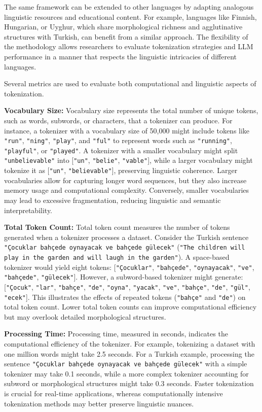 The same framework can be extended to other languages by adapting analogous linguistic resources and educational content. For example, languages like Finnish, Hungarian, or Uyghur, which share morphological richness and agglutinative structures with Turkish, can benefit from a similar approach. The flexibility of the methodology allows researchers to evaluate tokenization strategies and LLM performance in a manner that respects the linguistic intricacies of different languages.

Several metrics are used to evaluate both computational and linguistic aspects of tokenization.

\textbf{Vocabulary Size:}  
Vocabulary size represents the total number of unique tokens, such as words, subwords, or characters, that a tokenizer can produce. For instance, a tokenizer with a vocabulary size of 50,000 might include tokens like \texttt{"run"}, \texttt{"ning"}, \texttt{"play"}, and \texttt{"ful"} to represent words such as \texttt{"running"}, \texttt{"playful"}, or \texttt{"played"}. A tokenizer with a smaller vocabulary might split \texttt{"unbelievable"} into [\texttt{"un"}, \texttt{"belie"}, \texttt{"vable"}], while a larger vocabulary might tokenize it as [\texttt{"un"}, \texttt{"believable"}], preserving linguistic coherence. Larger vocabularies allow for capturing longer word sequences, but they also increase memory usage and computational complexity. Conversely, smaller vocabularies may lead to excessive fragmentation, reducing linguistic and semantic interpretability.

\textbf{Total Token Count:}  
Total token count measures the number of tokens generated when a tokenizer processes a dataset. Consider the Turkish sentence \texttt{"Çocuklar bahçede oynayacak ve bahçede gülecek"} (\texttt{"The children will play in the garden and will laugh in the garden"}). A space-based tokenizer would yield eight tokens: [\texttt{"Çocuklar"}, \texttt{"bahçede"}, \texttt{"oynayacak"}, \texttt{"ve"}, \texttt{"bahçede"}, \texttt{"gülecek"}]. However, a subword-based tokenizer might generate: [\texttt{"Çocuk"}, \texttt{"lar"}, \texttt{"bahçe"}, \texttt{"de"}, \texttt{"oyna"}, \texttt{"yacak"}, \texttt{"ve"}, \texttt{"bahçe"}, \texttt{"de"}, \texttt{"gül"}, \texttt{"ecek"}]. This illustrates the effects of repeated tokens (\texttt{"bahçe"} and \texttt{"de"}) on total token count. Lower total token counts can improve computational efficiency but may overlook detailed morphological structures.

\textbf{Processing Time:}  
Processing time, measured in seconds, indicates the computational efficiency of the tokenizer. For example, tokenizing a dataset with one million words might take 2.5 seconds. For a Turkish example, processing the sentence \texttt{"Çocuklar bahçede oynayacak ve bahçede gülecek"} with a simple tokenizer may take 0.1 seconds, while a more complex tokenizer accounting for subword or morphological structures might take 0.3 seconds. Faster tokenization is crucial for real-time applications, whereas computationally intensive tokenization methods may better preserve linguistic nuances.

